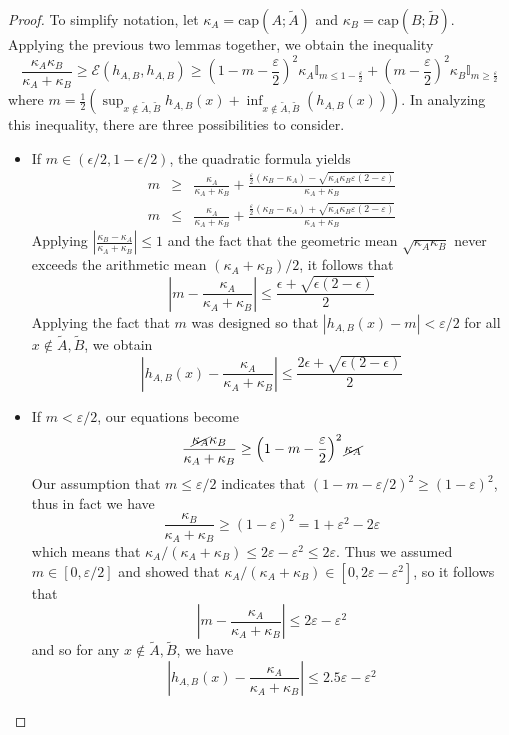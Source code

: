 \documentclass[english, aip, jcp, priprint, graphicx,floatfix]{revtex4-1}
\theoremstyle{plain}
\theoremstyle{definition}
\theoremstyle{plain}
\newcommand{\indicatorf}[1]{\mathbb{I}_{#1}}
\newcommand{\capac}[2]{\mathrm{cap}\left(#1;#2\right)}
\begin{document}
\begin{proof}
\newcommand{\capA}{\kappa_A}
\newcommand{\capB}{\kappa_B}

To simplify notation, let $\capA=\capac{A}{\tilde A}$ and $\capB=\capac{B}{\tilde B}$.  Applying the previous two lemmas together, we obtain the inequality
\[
\frac{\capA \capB}{\capA +\capB}
\geq \mathcal{E}(h_{A,B},h_{A,B}) \geq
\left( 1 - m - \frac{\varepsilon}{2} \right)^2 \capA \indicatorf{m\leq 1-\frac{\varepsilon}{2}} + 
   \left( m- \frac{\varepsilon}{2} \right)^2 \capB \indicatorf{m\geq \frac{\varepsilon}{2}} 
\]
where $m = \frac{1}{2} (\sup_{x \notin \tilde A,\tilde B} h_{A,B} (x) + \inf_{x \notin \tilde A,\tilde B} (h_{A,B} (x)))$.  In analyzing this inequality, there are three possibilities to consider.  
\begin{itemize}
    \item If $m \in (\epsilon/2,1-\epsilon/2)$, the quadratic formula yields
    \begin{eqnarray*}
    m & \geqslant & \frac{\capA}{\capA + \capB} + \frac{
    \frac{\varepsilon}{2}(\capB - \capA) - 
    \sqrt{\capA \capB \varepsilon( 2 - \varepsilon)}}{\capA+\capB}\\
    m & \leqslant & \frac{\capA}{\capA + \capB} + \frac{
    \frac{\varepsilon}{2}(\capB - \capA) +
    \sqrt{\capA \capB \varepsilon( 2 - \varepsilon)}}{\capA+\capB}
    \end{eqnarray*}
    Applying $\left|\frac{\capB - \capA}{\capA + \capB}\right| \leq 1$ and the fact that the geometric mean $\sqrt{\capA \capB}$ never exceeds the arithmetic mean $(\capA+\capB) / 2$, it follows that
    \[
    \left|m -  \frac{\capA}{\capA + \capB}\right| \leq \frac{\epsilon +\sqrt{\epsilon (2-\epsilon)}}{2}
    \]
    Applying the fact that $m$ was designed so that $|h_{A,B}(x) - m| <\varepsilon/2$ for all $x \notin \tilde A,\tilde B$, we obtain
    \[
    \left|h_{A,B}(x) -  \frac{\capA}{\capA + \capB}\right| \leq \frac{2\epsilon +\sqrt{\epsilon (2-\epsilon)}}{2}
    \]

    \item If $m<\varepsilon/2$, our equations become 
    \[
    \frac{\cancel{\capA} \capB}{\capA +\capB}
    \geq
    \left( 1-m- \frac{\varepsilon}{2} \right)^2 \cancel{\capA} 
    \]
    Our assumption that $m \leq \varepsilon/2$ indicates that $(1- m- \varepsilon/2)^2 \geq (1-\varepsilon)^2$, thus in fact we have 
    \[
    \frac{\capB}{\capA +\capB}
    \geq
    \left( 1- \varepsilon \right)^2  = 1 + \varepsilon^2 - 2\varepsilon
    \]
    which means that $\capA/(\capA +\capB)
    \leq
    2\varepsilon - \varepsilon^2 \leq 2\varepsilon$.  
    Thus we assumed $m\in[0,\varepsilon/2]$ and showed that $\capA/(\capA+\capB)\in[0,2\varepsilon-\varepsilon^2]$, so it follows that 
    \[
    \left|m -  \frac{\capA}{\capA + \capB}\right| \leq 2\varepsilon -\varepsilon^2
    \]
    and so for any $x\notin \tilde A,\tilde B$, we have 
    \[
    \left|h_{A,B}(x) -  \frac{\capA}{\capA + \capB}\right| \leq 2.5\varepsilon -\varepsilon^2
    \]
    

\end{itemize}
\end{proof}
\end{document}
